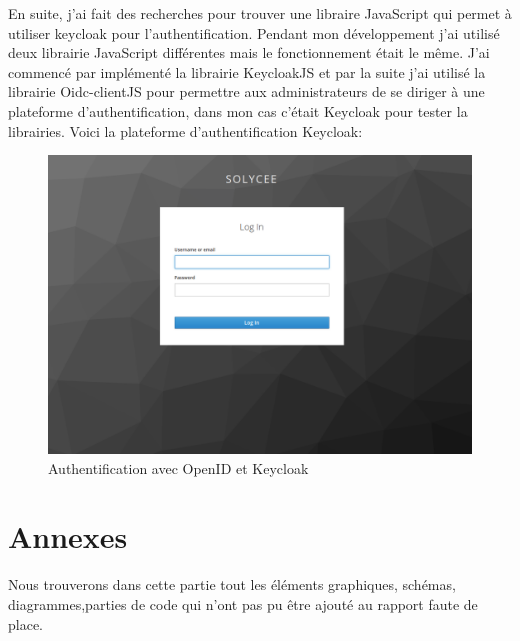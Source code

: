 \documentclass[12pt]{article}
\begin{document}
En suite, j'ai fait des recherches pour trouver une libraire JavaScript qui permet à utiliser keycloak pour l'authentification. Pendant mon développement j'ai utilisé deux librairie JavaScript différentes mais le fonctionnement était le même. J'ai commencé par implémenté la librairie KeycloakJS et par la suite j'ai utilisé la librairie Oidc-clientJS pour permettre aux administrateurs de se diriger à une plateforme d'authentification, dans mon cas c'était Keycloak pour tester la librairies. Voici la plateforme d'authentification Keycloak: 
 \begin{figure}[H]
	\centering
 		\includegraphics[width=1\textwidth]{diagrammes/authentification_keycloak.png} 
  		\caption{Authentification avec OpenID et Keycloak }
	\end{figure}

\newpage
\section{Annexes}

Nous trouverons dans cette partie tout les éléments graphiques, schémas, diagrammes,parties de code  qui n’ont pas pu être ajouté au rapport faute de place.
\end{document}
